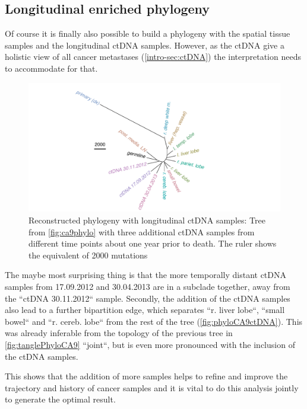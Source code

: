 \subsection{Longitudinal enriched phylogeny}
\label{variantcalling-sec:fullphylo}
Of course it is finally also possible to build a phylogeny with the spatial tissue samples and the longitudinal ctDNA samples. However, as the ctDNA give a holistic view of all cancer metastases (\autoref{intro-sec:ctDNA}) the interpretation needs to accommodate for that. 

\begin{figure}[!ht]
\centering
\includegraphics[width=.99\linewidth]{Figures/phyloCA9_withctDNA.pdf}
\caption[Reconstructed phylogeny with longitudinal ctDNA samples]{Reconstructed phylogeny with longitudinal ctDNA samples: Tree from \autoref{fig:ca9phylo} with three additional ctDNA samples from different time points about one year prior to death. The ruler shows the equivalent of 2000 mutations} \label{fig:phyloCA9ctDNA}
\end{figure}

The maybe most surprising thing is that the more temporally distant ctDNA samples from 17.09.2012 and 30.04.2013 are in a subclade together, away from the ``ctDNA 30.11.2012`` sample. Secondly, the addition of the ctDNA samples also lead to a further bipartition edge, which separates ``r. liver lobe``, ``small bowel`` and ``r. cereb. lobe`` from the rest of the tree (\autoref{fig:phyloCA9ctDNA}). This was already inferable from the topology of the previous tree in \autoref{fig:tanglePhyloCA9} ``joint``, but is even more pronounced with the inclusion of the ctDNA samples.

This shows that the addition of more samples helps to refine and improve the trajectory and history of cancer samples and it is vital to do this analysis jointly to generate the optimal result.